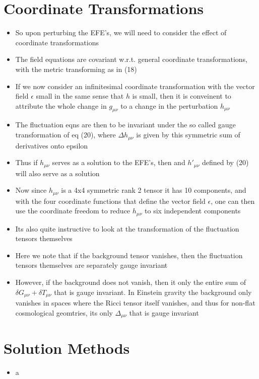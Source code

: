 \documentclass[10pt,letterpaper]{article}
\numberwithin{equation}{section}
\begin{document}
\section{Coordinate Transformations}
\begin{itemize}	
	\item So upon perturbing the EFE's, we will need to consider the effect of coordinate transformations
	\item The field equations are covariant w.r.t. general coordinate transformations, with the metric transforming as in (18)
	\item If we now consider an infinitesimal coordinate transformation with the vector field $\epsilon$ small in the same sense that $h$ is small, then it is conveinent to attribute the whole change in $g_{\mu\nu}$ to a change in the perturbation $h_{\mu\nu}$ 
	\item The fluctuation eqns are then to be invariant under the so called gauge transformation of eq (20), where $\Delta h_{\mu\nu}$ is given by this symmetric sum of derivatives onto epsilon
	\item Thus if $h_{\mu\nu}$ serves as a solution to the EFE's, then and $h'_{\mu\nu}$ defined by (20) will also serve as a solution
	\item Now since $h_{\mu\nu}$ is a 4x4 symmetric rank 2 tensor it has 10 components, and with the four coordinate functions that define the vector field $\epsilon$, one can then use the coordinate freedom to reduce $h_{\mu\nu}$ to six independent components
	\item Its also quite instructive to look at the transformation of the fluctuation tensors themselves
	\item Here we note that if the background tensor vanishes, then the fluctuation tensors themselves are separately gauge invariant
	\item However, if the background does not vanish, then it only the entire sum of $\delta G_{\mu\nu} + \delta T_{\mu\nu}$ that is gauge invariant. In Einstein gravity the background only vanishes in spaces where the Ricci tensor itself vanishes, and thus for non-flat cosmological geomtries, its only $\Delta_{\mu\nu}$ that is gauge invariant
\end{itemize}


\section{Solution Methods}
\begin{itemize}
	\item a
\end{itemize}
\end{document}
